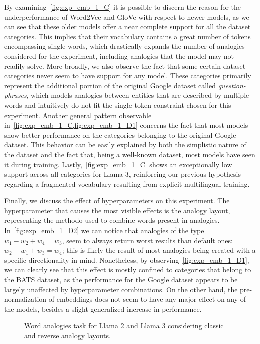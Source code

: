 By examining~\cref{fig:exp_emb_1_C} it is possible to discern the reason for the underperformance of Word2Vec and GloVe with respect to newer models, as we can see that these older models offer a near complete support for all the dataset categories.
This implies that their vocabulary contains a great number of tokens encompassing single words, which drastically expands the number of analogies considered for the experiment, including analogies that the model may not readily solve.
More broadly, we also observe the fact that some certain dataset categories never seem to have support for any model.
These categories primarily represent the additional portion of the original Google dataset called \emph{question-phrases}, which models analogies between entities that are described by multiple words and intuitively do not fit the single-token constraint chosen for this experiment.
Another general pattern observable in~\cref{fig:exp_emb_1_C,fig:exp_emb_1_D1} concerns the fact that most models show better performance on the categories belonging to the original Google dataset.
This behavior can be easily explained by both the simplistic nature of the dataset and the fact that, being a well-known dataset, most models have seen it during training.
Lastly,~\cref{fig:exp_emb_1_C} shows an exceptionally low support across all categories for Llama 3, reinforcing our previous hypothesis regarding a fragmented vocabulary resulting from explicit multilingual training.

Finally, we discuss the effect of hyperparameters on this experiment.
The hyperparameter that causes the most visible effects is the analogy layout, representing the methodo used to combine words present in analogies.
In~\cref{fig:exp_emb_1_D2} we can notice that analogies of the type $w_1 - w_2 + w_4 = w_3$, seem to always return worst results than default ones: $w_2 - w_1 + w_3 = w_4$; this is likely the result of most analogies being created with a specific directionality in mind.
Nonetheless, by observing~\cref{fig:exp_emb_1_D1}, we can clearly see that this effect is mostly confined to categories that belong to the BATS dataset, as the performance for the Google dataset appears to be largely unaffected by hyperparameter combinations.
On the other hand, the pre-normalization of embeddings does not seem to have any major effect on any of the models, besides a slight generalized increase in performance.

\begin{figure}[t!]
    \centering
    \quad
    \caption{Word analogies task for Llama 2 and Llama 3 considering classic and reverse analogy layouts.}
    \label{fig:exp_emb_1_D}
\end{figure}


